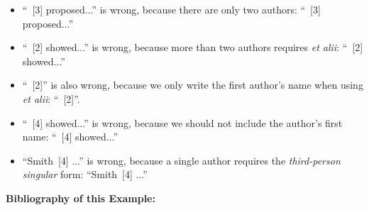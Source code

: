 \documentclass[11pt,a4paper]{article}
\begin{document}
\begin{badexample}
  \begin{NoHyper}
    \begin{itemize}[leftmargin=1em]
    \item ``~[3] proposed...'' is wrong, because there are only two authors: ``~[3] proposed...''
        
    \item ``~[2] showed...'' is wrong, because more than two authors requires \emph{et alii}: ``~[2] showed...''
        
    \item ``~[2]'' is also wrong, because we only write the first author's name when using \emph{et alii}: ``~[2]''.
        
    \item ``~[4] showed...'' is wrong, because we should not include the author's first name: ``~[4] showed...''
        
    \item ``Smith~[4] ...'' is wrong, because a single author requires the \emph{third-person singular} form: ``Smith~[4] ...''
    \end{itemize}
 
    \vspace{2.0em}

    {\normalsize{}
    \textbf{Bibliography of this Example:}
    \vspace{1.0em}


    {\normalsize
        
        
    }
    }
  \end{NoHyper}
\end{badexample}
\end{document}
